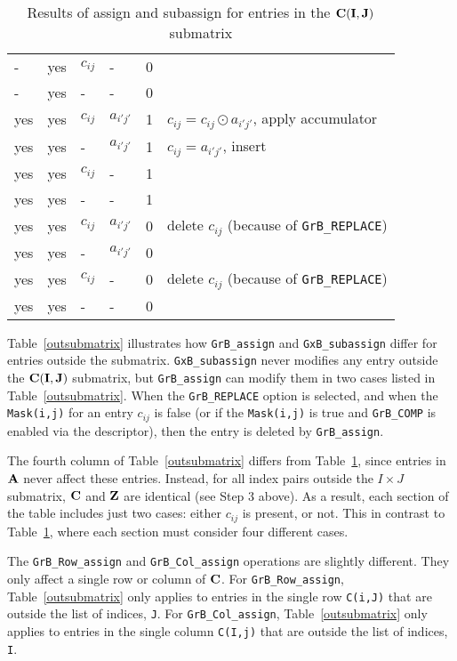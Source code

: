 \documentclass[12pt]{article}
\begin{document}
\begin{table}
{\begin{tabular}{lllll|l}
    -  &yes & $c_{ij}$ &  -          & 0    &   \\
    -  &yes &  -       &  -          & 0    &   \\
\hline
    yes&yes & $c_{ij}$ & $a_{i'j'}$  & 1    &  $c_{ij} = c_{ij} \odot a_{i'j'}$, apply accumulator \\
    yes&yes &  -       & $a_{i'j'}$  & 1    &  $c_{ij} = a_{i'j'}$, insert \\
    yes&yes & $c_{ij}$ &  -          & 1    &   \\
    yes&yes &  -       &  -          & 1    &   \\
    yes&yes & $c_{ij}$ & $a_{i'j'}$  & 0    &  delete $c_{ij}$  (because of \verb'GrB_REPLACE') \\
    yes&yes &  -       & $a_{i'j'}$  & 0    &   \\
    yes&yes & $c_{ij}$ &  -          & 0    &  delete $c_{ij}$  (because of \verb'GrB_REPLACE') \\
    yes&yes &  -       &  -          & 0    &   \\
\hline
\end{tabular}
}
\caption{Results of assign and subassign for entries in the ${\bf C(I,J)}$ submatrix \label{insubmatrix}}
\end{table}

\newpage
Table~\ref{outsubmatrix} illustrates how \verb'GrB_assign' and
\verb'GxB_subassign' differ for entries outside the submatrix.
\verb'GxB_subassign' never modifies any entry outside the ${\bf C(I,J)}$
submatrix, but \verb'GrB_assign' can modify them in two cases listed in
Table~\ref{outsubmatrix}.  When the \verb'GrB_REPLACE' option is selected, and
when the \verb'Mask(i,j)' for an entry $c_{ij}$ is false (or if the
\verb'Mask(i,j)' is true and \verb'GrB_COMP' is enabled via the descriptor),
then the entry is deleted by \verb'GrB_assign'.

The fourth column of Table~\ref{outsubmatrix} differs from
Table~\ref{insubmatrix}, since entries in ${\bf A}$ never affect these entries.
Instead, for all index pairs outside the $I \times J$ submatrix, ${\bf C}$ and
${\bf Z}$ are identical (see Step 3 above).  As a result, each section of the
table includes just two cases: either $c_{ij}$ is present, or not.   This in
contrast to Table~\ref{insubmatrix}, where each section must consider four
different cases.

The \verb'GrB_Row_assign' and \verb'GrB_Col_assign' operations are slightly
different.  They only affect a single row or column of ${\bf C}$.
For \verb'GrB_Row_assign', Table~\ref{outsubmatrix} only applies to entries in
the single row \verb'C(i,J)' that are outside the list of indices, \verb'J'.
For \verb'GrB_Col_assign', Table~\ref{outsubmatrix} only applies to entries in
the single column \verb'C(I,j)' that are outside the list of indices, \verb'I'.
\end{document}
